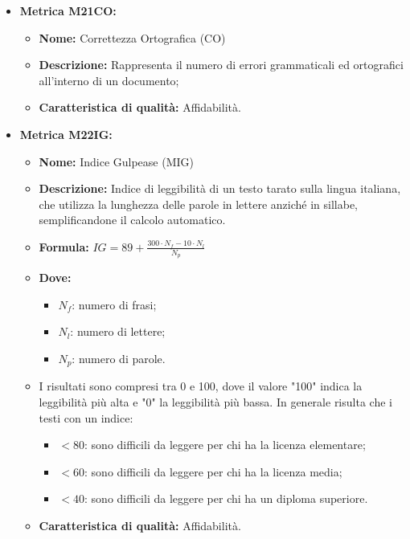 \begin{itemize}
    \item \textbf{Metrica M21CO:}
          \begin{itemize}
              \item \textbf{Nome:} Correttezza Ortografica (CO)
              \item \textbf{Descrizione:} Rappresenta il numero di errori grammaticali ed
              ortografici all'interno di un documento;
              \item \textbf{Caratteristica di qualità:} Affidabilità.
          \end{itemize}

            \item \textbf{Metrica M22IG:}
            \begin{itemize}
                \item \textbf{Nome:} Indice Gulpease (MIG)
                \item \textbf{Descrizione:} Indice di leggibilità di un testo tarato sulla lingua italiana, che utilizza la lunghezza delle parole in lettere anziché in sillabe, semplificandone il calcolo automatico.
                \item \textbf{Formula:} $IG = 89 + \frac{300 \cdot N_f - 10 \cdot N_l}{N_p}$
                \item \textbf{Dove:}
                      \begin{itemize}
                          \item $N_f$: numero di frasi;
                          \item $N_l$: numero di lettere;
                          \item $N_p$: numero di parole.
                      \end{itemize}
                \item I risultati sono compresi tra 0 e 100, dove il valore "100" indica la leggibilità più alta e "0" la leggibilità più bassa. In generale risulta che i testi con un indice:
                      \begin{itemize}
                          \item $< 80$: sono difficili da leggere per chi ha la licenza elementare;
                          \item $< 60$: sono difficili da leggere per chi ha la licenza media;
                          \item $< 40$: sono difficili da leggere per chi ha un diploma superiore.
                      \end{itemize}
                \item \textbf{Caratteristica di qualità:} Affidabilità.
            \end{itemize}


\end{itemize}
